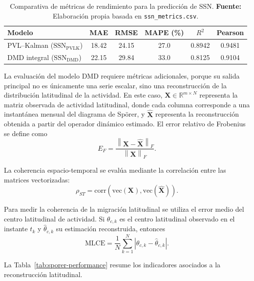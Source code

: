 \begin{table}[H]
\centering
\caption{Comparativa de métricas de rendimiento para la predicción de SSN. \textbf{Fuente:} Elaboración propia basada en \texttt{ssn\_metrics.csv}.}
\label{tab:ssn-metrics-comparison}
\begin{tabular}{lccccc}
\hline
\textbf{Modelo} & \textbf{MAE} & \textbf{RMSE} & \textbf{MAPE (\%)} & \textbf{$R^2$} & \textbf{Pearson} \\ \hline
PVL--Kalman ($\mathrm{SSN}_{\mathrm{PVLK}}$) & 18.42 & 24.15 & 27.0 & 0.8942 & 0.9481 \\
DMD integral ($\mathrm{SSN}_{\mathrm{DMD}}$) & 22.15 & 29.84 & 33.0 & 0.8125 & 0.9104 \\ \hline
\end{tabular}
\end{table}

La evaluación del modelo DMD requiere métricas adicionales, porque su salida principal no es únicamente una serie escalar, sino una reconstrucción de la distribución latitudinal de la actividad. En este caso, $\mathbf{X}\in\mathbb{R}^{m\times N}$ representa la matriz observada de actividad latitudinal, donde cada columna corresponde a una instantánea mensual del diagrama de Spörer, y $\widehat{\mathbf{X}}$ representa la reconstrucción obtenida a partir del operador dinámico estimado. El error relativo de Frobenius se define como
\begin{equation}
E_F=\frac{\left\|\mathbf{X}-\widehat{\mathbf{X}}\right\|_F}{\left\|\mathbf{X}\right\|_F}.
\end{equation}

La coherencia espacio-temporal se evalúa mediante la correlación entre las matrices vectorizadas:
\begin{equation}
\rho_{ST}=\mathrm{corr}\left(\mathrm{vec}(\mathbf{X}),\mathrm{vec}(\widehat{\mathbf{X}})\right).
\end{equation}

Para medir la coherencia de la migración latitudinal se utiliza el error medio del centro latitudinal de actividad. Si $\theta_{c,k}$ es el centro latitudinal observado en el instante $t_k$ y $\widehat{\theta}_{c,k}$ su estimación reconstruida, entonces
\begin{equation}
\mathrm{MLCE}=\frac{1}{N}\sum_{k=1}^{N}\left|\theta_{c,k}-\widehat{\theta}_{c,k}\right|.
\end{equation}

La Tabla~\ref{tab:sporer-performance} resume los indicadores asociados a la reconstrucción latitudinal.

